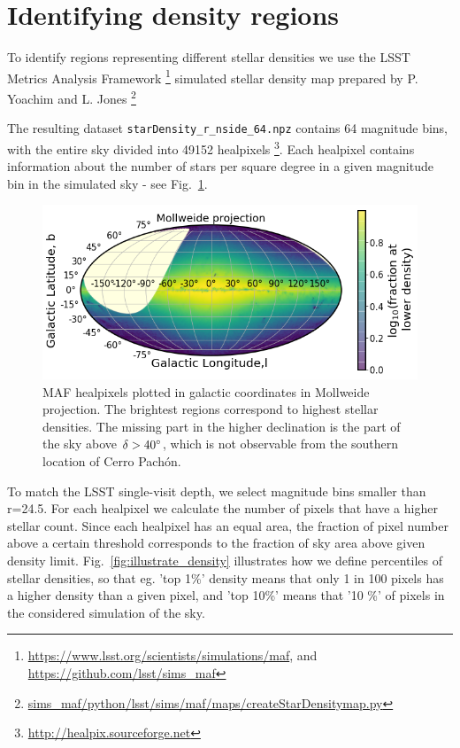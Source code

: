 \documentclass[DM,lsstdraft,toc,usenatbib]{lsstdoc}
\begin{document}
\section{Identifying density regions}
\label{sec:MAF}
To identify regions representing different stellar densities we use the LSST  Metrics Analysis Framework \footnote{\url{https://www.lsst.org/scientists/simulations/maf}, and \url{https://github.com/lsst/sims_maf}} simulated stellar density map prepared by P. Yoachim and L. Jones 
\footnote{\url{sims_maf/python/lsst/sims/maf/maps/createStarDensitymap.py}}

The  resulting dataset \verb|starDensity_r_nside_64.npz| contains 64 magnitude bins, with the entire sky divided into 49152  healpixels \footnote{\url{http://healpix.sourceforge.net}}. Each healpixel contains information about the number of stars per square degree in a given magnitude bin in the simulated sky - see Fig.~\ref{fig:MAF_densities}.

\begin{figure}
\includegraphics[width=1.0\columnwidth]{figs/01_MAF_densities.png}
\caption{MAF healpixels plotted in galactic coordinates in Mollweide projection. The brightest regions correspond to highest stellar densities. The missing part in the higher declination is the part of the sky above $\delta>40 \degree$, which is not observable from the southern location of Cerro Pach\'on.}
\label{fig:MAF_densities}
\end{figure} 


To match the LSST single-visit depth,  we select magnitude bins smaller than r=24.5.   For each healpixel we calculate the number of pixels that have a higher stellar count.  Since each healpixel has an equal area, the fraction of pixel number above a certain threshold corresponds to the fraction of sky area above given density limit.  Fig.~\ref{fig:illustrate_density} illustrates how we define percentiles of stellar densities, so that eg. 'top 1\%' density means that only 1 in 100 pixels has a higher density than a given pixel, and 'top 10\%' means that '10 \%' of pixels in the considered simulation of the sky. 
\end{document}
